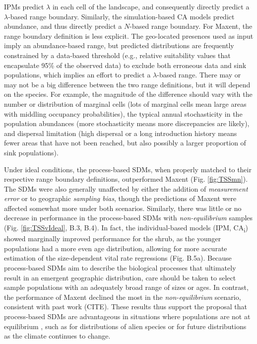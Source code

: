 \documentclass[preprint,review,times,12pt]{elsarticle}
\begin{document}
IPMs predict $\lambda$ in each cell of the landscape, and consequently directly predict a $\lambda$-based range boundary. Similarly, the simulation-based CA models predict abundance, and thus directly predict a $N$-based range boundary. For Maxent, the range boundary definition is less explicit. The geo-located presences used as input imply an abundance-based range, but predicted distributions are frequently constrained by a data-based threshold (e.g., relative suitability values that encapsulate 95\% of the observed data) to exclude both erroneous data and sink populations, which implies an effort to predict a $\lambda$-based range. There may or may not be a big difference between the two range definitions, but it will depend on the species. For example, the magnitude of the difference should vary with the number or distribution of marginal cells (lots of marginal cells mean large areas with middling occupancy probabilities), the typical annual stochasticity in the population abundances (more stochasticity means more discrepancies are likely), and dispersal limitation (high dispersal or a long introduction history means fewer areas that have not been reached, but also possibly a larger proportion of sink populations). 

Under ideal conditions, the process-based SDMs, when properly matched to their respective range boundary definitions, outperformed Maxent (Fig. \ref{fig:TSSmn}). The SDMs were also generally unaffected by either the addition of \emph{measurement error} or to geographic \emph{sampling bias}, though the predictions of Maxent were affected somewhat more under both scenarios. Similarly, there was little or no decrease in performance in the process-based SDMs with \emph{non-equilibrium} samples (Fig. \ref{fig:TSSvIdeal}, B.3, B.4). In fact, the individual-based models (IPM, CA\textsubscript{i}) showed marginally improved performance for the shrub, as the younger populations had a more even age distribution, allowing for more accurate estimation of the size-dependent vital rate regressions (Fig. B.5a). Because process-based SDMs aim to describe the biological processes that ultimately result in an emergent geographic distribution, care should be taken to select sample populations with an adequately broad range of sizes or ages. In contrast, the performance of Maxent declined the most in the \emph{non-equilibrium} scenario, consistent with past work (CITE). These results thus support the proposal that process-based SDMs are advantageous in situations where populations are not at equilibrium \citep{Merow2011a,Evans2016,Merow2017,Cabral2017}, such as for distributions of alien species or for future distributions as the climate continues to change. 
\end{document}
